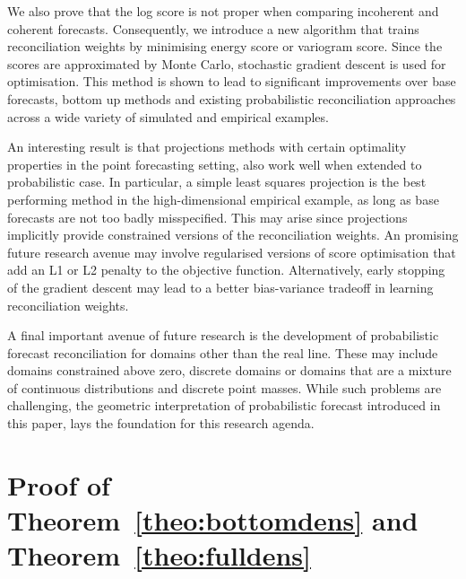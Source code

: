 \documentclass[12pt]{article}
\theoremstyle{definition}
\begin{document}
We also prove that the log score is not proper when comparing incoherent and coherent forecasts.  Consequently, we introduce a new algorithm that trains reconciliation weights by minimising energy score or variogram score.  Since the scores are approximated by Monte Carlo, stochastic gradient descent is used for optimisation.  This method is shown to lead to significant improvements over base forecasts, bottom up methods and existing probabilistic reconciliation approaches across a wide variety of simulated and empirical examples. 

An interesting result is that projections methods with certain optimality properties in the point forecasting setting, also work well when extended to probabilistic case.  In particular, a simple least squares projection is the best performing method in the high-dimensional empirical example, as long as base forecasts are not too badly misspecified.  This may arise since projections implicitly provide constrained versions of the reconciliation weights.  An promising future research avenue may involve regularised versions of score optimisation that add an L1 or L2 penalty to the objective function.  Alternatively, early stopping \citep{BuhYu2003,YaoEtAl2007} of the gradient descent may lead to a better bias-variance tradeoff in learning reconciliation weights.

A final important avenue of future research is the development of probabilistic forecast reconciliation for domains other than the real line.  These may include domains constrained above zero, discrete domains or domains that are a mixture of continuous distributions and discrete point masses.  While such problems are challenging, the geometric interpretation of probabilistic forecast introduced in this paper, lays the foundation for this research agenda.


\newpage

\appendix

\section{Proof of Theorem~\ref{theo:bottomdens} and Theorem~\ref{theo:fulldens}} \label{app:Bottom&FullDens}
\end{document}
